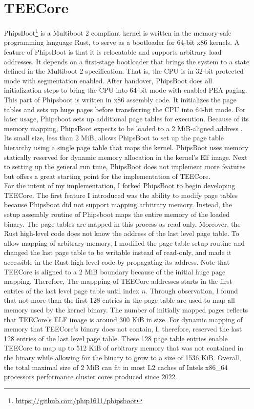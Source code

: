 \section{TEECore}
\label{sec:implementation:teeKernel}
PhipsBoot\footnote{\url{https://github.com/phip1611/phipsboot}} is a Multiboot 2
compliant kernel is written in the memory-safe programming language Rust, to
serve as a bootloader for 64-bit x86 kernels. A feature of PhipsBoot is that it
is relocatable and supports arbitrary load addresses. It depends on a
first-stage bootloader that
brings the system to a state defined in the Multiboot 2 specification. That is,
the CPU is in 32-bit protected mode with segmentation enabled. After handover,
PhipsBoot does all initialization steps to bring the CPU into 64-bit mode with
enabled PEA paging. This part of Phipsboot is written in x86 assembly code. It
initializes the page tables and sets up huge pages before transferring the CPU
into 64-bit mode. For later usage, Phipsboot sets up additional page tables for
execution. Because of its memory mapping, PhipsBoot expects to be loaded to a 2
MiB-aligned address . Its small size, less than 2 MiB, allows PhipsBoot to set
up the page table hierarchy using a single page table that maps the kernel.
PhipsBoot uses memory statically reserved for dynamic memory allocation in the
kernel's Elf image. Next to setting up the general run time, PhipsBoot does not
implement more features but offers a great starting point for the implementation
of TEECore. \\

For the intent of my implementation, I forked PhipsBoot to begin developing
TEECore. The first feature I introduced was the ability to modify page tables
because Phipsboot did not support mapping arbitrary memory. Instead, the setup
assembly routine of Phipsboot maps the entire memory of the loaded binary. The
page tables are mapped in this process as read-only. Moreover, the Rust
high-level code does not know the address of the last level page table. To allow
mapping of arbitrary memory, I modified the page table setup routine and changed
the last page table to be writable instead of read-only, and made it accessible
in the Rust high-level code by propagating its address. Note that TEECore is
aligned to a 2 MiB boundary because of the initial huge page mapping. Therefore,
The mappping of TEECore addresses starts in the first entries of the last level
page table until index $n$. Through observation, I found that not more than the
first 128 entries in the page table are used to map all memory used by the
kernel binary. The number of initially mapped pages reflects that TEECore's ELF
image is around 300 KiB in size. For dynamic mapping of memory that TEECore's
binary does not contain, I, therefore, reserved the last 128 entries of the last
level page table. These 128 page table entries enable  TEECore to map up to 512
KiB of arbitrary memory that was not contained in the binary while allowing for
the binary to grow to a size of 1536 KiB. Overall, the total maximal size of 2
MiB can fit in most L2 caches of Intels x86\_64 processors performance cluster
cores produced since 2022.\\

